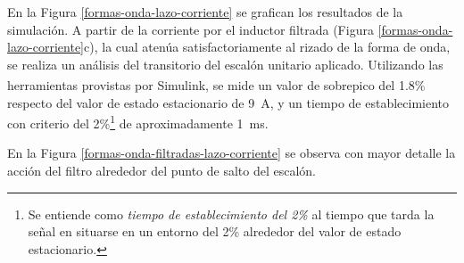 En la Figura \ref{formas-onda-lazo-corriente} se grafican los resultados de la simulación. A partir de la corriente por el inductor filtrada (Figura \ref{formas-onda-lazo-corriente}c), la cual atenúa satisfactoriamente al rizado de la forma de onda, se realiza un análisis del transitorio del escalón unitario aplicado. Utilizando las herramientas provistas por Simulink\textsuperscript\textregistered, se mide un valor de sobrepico del 1.8\% respecto del valor de estado estacionario de \SI{9}{\ampere}, y un tiempo de establecimiento con criterio del 2\%\footnote{Se entiende como \emph{tiempo de establecimiento del 2\%} al tiempo que tarda la señal en situarse en un entorno del 2\% alrededor del valor de estado estacionario.} de aproximadamente \SI{1}{\milli\second}.

En la Figura \ref{formas-onda-filtradas-lazo-corriente} se observa con mayor detalle la acción del filtro alrededor del punto de salto del escalón.

